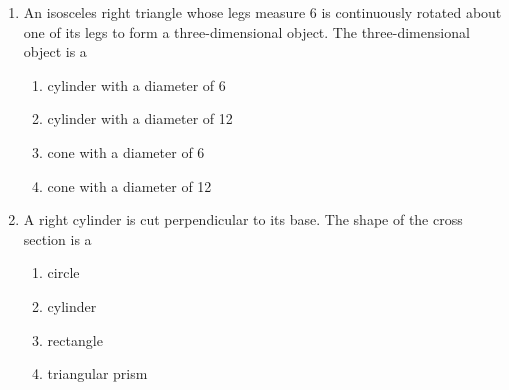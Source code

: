 \documentclass[12pt, twoside]{article}
\begin{document}
\begin{enumerate}
  \item An isosceles right triangle whose legs measure 6 is continuously rotated about one of its legs to form a three-dimensional object. The three-dimensional object is a
    \begin{enumerate}
      \item cylinder with a diameter of 6
      \item cylinder with a diameter of 12
      \item cone with a diameter of 6
      \item cone with a diameter of 12
    \end{enumerate}

    \item A right cylinder is cut perpendicular to its base. The shape of the cross section is a
      \begin{enumerate}
        \item circle
        \item cylinder
        \item rectangle
        \item triangular prism
      \end{enumerate}


\end{enumerate}
\end{document}
